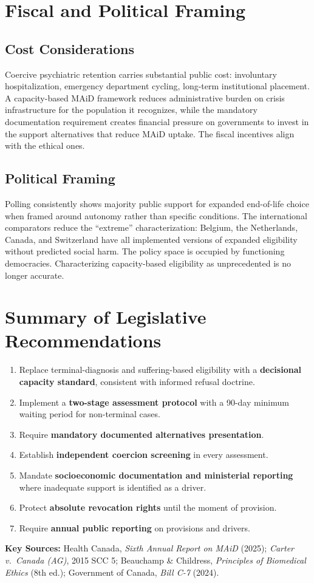 \documentclass[11pt, letterpaper]{article}
\begin{document}
\section{Fiscal and Political Framing}

\subsection{Cost Considerations}

Coercive psychiatric retention carries substantial public cost: involuntary hospitalization,
emergency department cycling, long-term institutional placement. A capacity-based MAiD
framework reduces administrative burden on crisis infrastructure for the population it
recognizes, while the mandatory documentation requirement creates financial pressure on
governments to invest in the support alternatives that reduce MAiD uptake. The fiscal
incentives align with the ethical ones.

\subsection{Political Framing}

Polling consistently shows majority public support for expanded end-of-life choice when
framed around autonomy rather than specific conditions. The international comparators reduce
the ``extreme'' characterization: Belgium, the Netherlands, Canada, and Switzerland have all
implemented versions of expanded eligibility without predicted social harm. The policy space
is occupied by functioning democracies. Characterizing capacity-based eligibility as
unprecedented is no longer accurate.

\section*{Summary of Legislative Recommendations}

\begin{enumerate}
  \item Replace terminal-diagnosis and suffering-based eligibility with a
    \textbf{decisional capacity standard}, consistent with informed refusal doctrine.
  \item Implement a \textbf{two-stage assessment protocol} with a 90-day minimum
    waiting period for non-terminal cases.
  \item Require \textbf{mandatory documented alternatives presentation}.
  \item Establish \textbf{independent coercion screening} in every assessment.
  \item Mandate \textbf{socioeconomic documentation and ministerial reporting}
    where inadequate support is identified as a driver.
  \item Protect \textbf{absolute revocation rights} until the moment of provision.
  \item Require \textbf{annual public reporting} on provisions and drivers.
\end{enumerate}

\bigskip

{\small\sffamily\color{C@midgray}
\textbf{Key Sources:} Health Canada, \textit{Sixth Annual Report on MAiD} (2025);
\textit{Carter v.\ Canada (AG)}, 2015 SCC 5; Beauchamp \& Childress,
\textit{Principles of Biomedical Ethics} (8th ed.); Government of Canada,
\textit{Bill C-7} (2024).}
\end{document}
